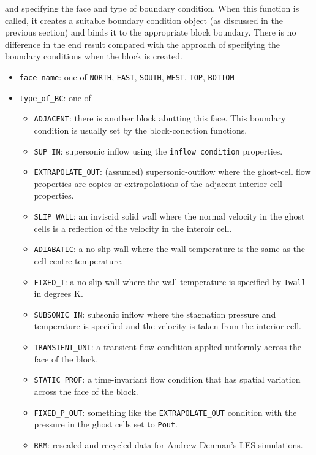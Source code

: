 \noindent
and specifying the face and type of boundary condition.
When this function is called, it creates a suitable boundary condition object 
(as discussed in the previous section) and binds it to the appropriate block boundary.
There is no difference in the end result compared with the approach of
specifying the boundary conditions when the block is created. 
\begin{itemize}
  \item \texttt{face\_name}: one of \texttt{NORTH}, \texttt{EAST},
    \texttt{SOUTH}, \texttt{WEST}, \texttt{TOP}, \texttt{BOTTOM}
  \item \texttt{type\_of\_BC}: one of 
    \begin{itemize}
      \item \texttt{ADJACENT}: there is another block abutting this face.
        This boundary condition is usually set by the block-conection functions.
      \item \texttt{SUP\_IN}: supersonic inflow using the
        \texttt{inflow\_condition} properties.
      \item \texttt{EXTRAPOLATE\_OUT}: (assumed) supersonic-outflow where the
        ghost-cell flow properties are copies or extrapolations 
        of the adjacent interior cell properties.
      \item \texttt{SLIP\_WALL}: an inviscid solid wall where the normal
        velocity in the ghost cells is a reflection of the velocity in the
        interoir cell.
      \item \texttt{ADIABATIC}: a no-slip wall where the wall temperature is
        the same as the cell-centre temperature.
      \item \texttt{FIXED\_T}: a no-slip wall where the wall temperature is
        specified by \texttt{Twall} in degrees K.
      \item \texttt{SUBSONIC\_IN}: subsonic inflow where the stagnation
        pressure and temperature is specified and the velocity is taken from
        the interior cell.
      \item \texttt{TRANSIENT\_UNI}: a transient flow condition applied
        uniformly across the face of the block.
      \item \texttt{STATIC\_PROF}: a time-invariant flow condition that has
        spatial variation across the face of the block.
      \item \texttt{FIXED\_P\_OUT}: something like the \texttt{EXTRAPOLATE\_OUT}
        condition with the pressure in the ghost cells set to \texttt{Pout}.
      \item \texttt{RRM}: rescaled and recycled data for Andrew Denman's LES simulations.

\end{itemize}
\end{itemize}
